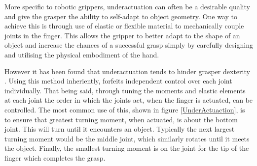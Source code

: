 More specific to robotic grippers, underactuation can often be a desirable quality and give the grasper the ability to self-adapt to object geometry. One way to achieve this is through use of elastic or flexible material to mechanically couple joints in the finger. This allows the gripper to better adapt to the shape of an object and increase the chances of a successful grasp simply by carefully designing and utilising the physical embodiment of the hand.

However it has been found that underactuation tends to hinder grasper dexterity \cite{RBOHand2}. Using this method inheriently, forfeits independent control over each joint individually. That being said, through tuning the moments and elastic elements at each joint the order in which the joints act, when the finger is actuated, can be controlled. The most common use of this, shown in figure \ref{UnderActuaction}, is to ensure that greatest turning moment, when actuated, is about the bottom joint. This will turn until it encounters an object. Typically the next largest turning moment would be the middle joint, which similarly rotates until it meets the object. Finally, the smallest turning moment is on the joint for the tip of the finger which completes the grasp.


